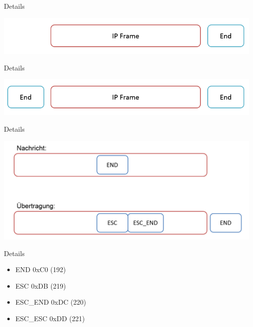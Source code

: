 \documentclass[beamer]{uibk}
\begin{document}
\begin{frame}{Details}
  \newpage
  \begin{center}
  \includegraphics[width=\textwidth,height=\textheight,keepaspectratio]{ip1.png}
  \end{center}
\end{frame}

\begin{frame}{Details}
  \newpage
  \begin{center}
  \includegraphics[width=\textwidth,height=\textheight,keepaspectratio]{ip2.png}
  \end{center}
\end{frame}

\begin{frame}{Details}
  \newpage
  \begin{center}
  \includegraphics[width=\textwidth,height=\textheight,keepaspectratio]{escaping.png}
  \end{center}
\end{frame}

\begin{frame}{Details}
  \newpage
  \begin{center}
  \begin{itemize}
    \item END      \tabto{3cm} 0xC0 (192)
    \item ESC      \tabto{3cm} 0xDB (219)
    \item ESC\_END \tabto{3cm} 0xDC (220)
    \item ESC\_ESC \tabto{3cm} 0xDD (221)
  \end{itemize}
  \end{center}
\end{frame}
\end{document}
